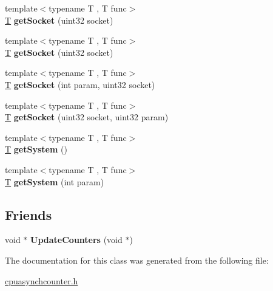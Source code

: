 \begin{DoxyCompactItemize}
\item 
\mbox{\label{class_asynchron_counter_state_a272fad1f3bd704f873c9c3a29e95192b}} 
{\footnotesize template$<$typename T , T  func$>$ }\\\mbox{\hyperlink{struct_t}{T}} {\bfseries get\+Socket} (uint32 socket)
\item 
\mbox{\label{class_asynchron_counter_state_a272fad1f3bd704f873c9c3a29e95192b}} 
{\footnotesize template$<$typename T , T  func$>$ }\\\mbox{\hyperlink{struct_t}{T}} {\bfseries get\+Socket} (uint32 socket)
\item 
\mbox{\label{class_asynchron_counter_state_aba3224acb89e692bb7024c85a516b8cb}} 
{\footnotesize template$<$typename T , T  func$>$ }\\\mbox{\hyperlink{struct_t}{T}} {\bfseries get\+Socket} (int param, uint32 socket)
\item 
\mbox{\label{class_asynchron_counter_state_ac5441bad9ff3aaccbe5b3b8965e091d2}} 
{\footnotesize template$<$typename T , T  func$>$ }\\\mbox{\hyperlink{struct_t}{T}} {\bfseries get\+Socket} (uint32 socket, uint32 param)
\item 
\mbox{\label{class_asynchron_counter_state_aa474d444ebe77a8c7e94c904e87879ae}} 
{\footnotesize template$<$typename T , T  func$>$ }\\\mbox{\hyperlink{struct_t}{T}} {\bfseries get\+System} ()
\item 
\mbox{\label{class_asynchron_counter_state_a689f439c1e0f3b68401a0dd4341b46f0}} 
{\footnotesize template$<$typename T , T  func$>$ }\\\mbox{\hyperlink{struct_t}{T}} {\bfseries get\+System} (int param)
\end{DoxyCompactItemize}
\subsection*{Friends}
\begin{DoxyCompactItemize}
\item 
\mbox{\label{class_asynchron_counter_state_a972a576e955b250f38283c8c165a6c7a}} 
void $\ast$ {\bfseries Update\+Counters} (void $\ast$)
\end{DoxyCompactItemize}


The documentation for this class was generated from the following file\+:\begin{DoxyCompactItemize}
\item 
\mbox{\hyperlink{cpuasynchcounter_8h}{cpuasynchcounter.\+h}}\end{DoxyCompactItemize}
